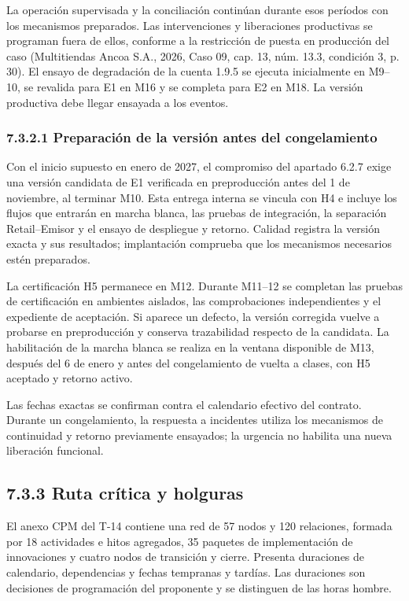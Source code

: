 \documentclass[11pt]{article}
\begin{document}
La operación supervisada y la conciliación continúan durante esos períodos con los mecanismos preparados. Las intervenciones y liberaciones productivas se programan fuera de ellos, conforme a la restricción de puesta en producción del caso (Multitiendas Ancoa S.A., 2026, Caso 09, cap. 13, núm. 13.3, condición 3, p. 30). El ensayo de degradación de la cuenta 1.9.5 se ejecuta inicialmente en M9--10, se revalida para E1 en M16 y se completa para E2 en M18. La versión productiva debe llegar ensayada a los eventos.

\subsubsection{7.3.2.1 Preparación de la versión antes del congelamiento}

Con el inicio supuesto en enero de 2027, el compromiso del apartado 6.2.7 exige una versión candidata de E1 verificada en preproducción antes del 1 de noviembre, al terminar M10. Esta entrega interna se vincula con H4 e incluye los flujos que entrarán en marcha blanca, las pruebas de integración, la separación Retail--Emisor y el ensayo de despliegue y retorno. Calidad registra la versión exacta y sus resultados; implantación comprueba que los mecanismos necesarios estén preparados.

La certificación H5 permanece en M12. Durante M11--12 se completan las pruebas de certificación en ambientes aislados, las comprobaciones independientes y el expediente de aceptación. Si aparece un defecto, la versión corregida vuelve a probarse en preproducción y conserva trazabilidad respecto de la candidata. La habilitación de la marcha blanca se realiza en la ventana disponible de M13, después del 6 de enero y antes del congelamiento de vuelta a clases, con H5 aceptado y retorno activo.

Las fechas exactas se confirman contra el calendario efectivo del contrato. Durante un congelamiento, la respuesta a incidentes utiliza los mecanismos de continuidad y retorno previamente ensayados; la urgencia no habilita una nueva liberación funcional.

\subsection{7.3.3 Ruta crítica y holguras}

El anexo CPM del T-14 contiene una red de 57 nodos y 120 relaciones, formada por 18 actividades e hitos agregados, 35 paquetes de implementación de innovaciones y cuatro nodos de transición y cierre. Presenta duraciones de calendario, dependencias y fechas tempranas y tardías. Las duraciones son decisiones de programación del proponente y se distinguen de las horas hombre.
\end{document}
